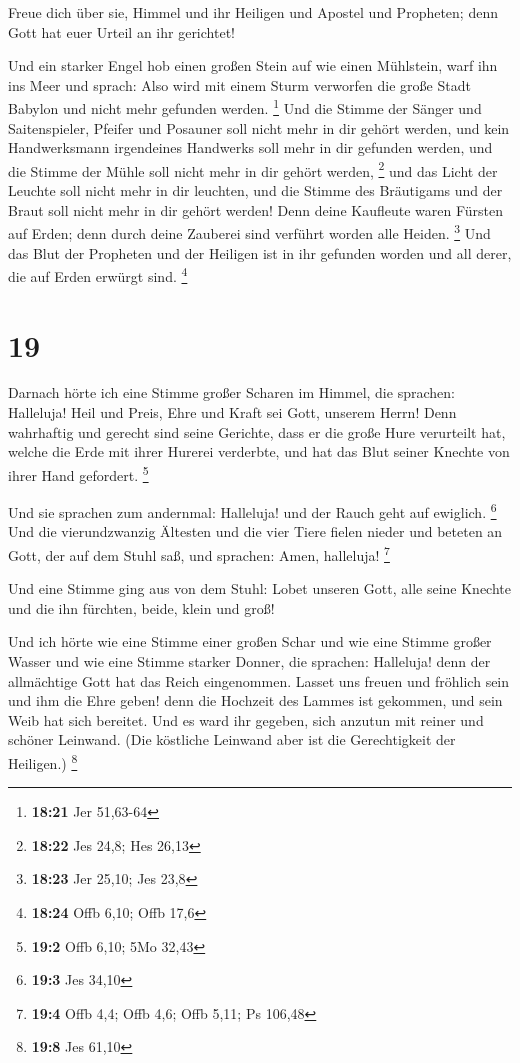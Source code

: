  Freue dich über sie, Himmel und ihr Heiligen und Apostel
und Propheten; denn Gott hat euer Urteil an ihr gerichtet!

 Und ein starker Engel hob einen großen Stein auf wie
einen Mühlstein, warf ihn ins Meer und sprach: Also wird mit einem Sturm
verworfen die große Stadt Babylon und nicht mehr gefunden werden.
\footnote{\textbf{18:21} Jer 51,63-64}  Und die Stimme
der Sänger und Saitenspieler, Pfeifer und Posauner soll nicht mehr in
dir gehört werden, und kein Handwerksmann irgendeines Handwerks soll
mehr in dir gefunden werden, und die Stimme der Mühle soll nicht mehr in
dir gehört werden, \footnote{\textbf{18:22} Jes 24,8; Hes 26,13}
 und das Licht der Leuchte soll nicht mehr in dir
leuchten, und die Stimme des Bräutigams und der Braut soll nicht mehr in
dir gehört werden! Denn deine Kaufleute waren Fürsten auf Erden; denn
durch deine Zauberei sind verführt worden alle Heiden. \footnote{\textbf{18:23}
  Jer 25,10; Jes 23,8}  Und das Blut der Propheten und
der Heiligen ist in ihr gefunden worden und all derer, die auf Erden
erwürgt sind. \footnote{\textbf{18:24} Offb 6,10; Offb 17,6}

\hypertarget{section-8}{%
\section{19}\label{section-8}}

 Darnach hörte ich eine Stimme großer Scharen im Himmel,
die sprachen: Halleluja! Heil und Preis, Ehre und Kraft sei Gott,
unserem Herrn!  Denn wahrhaftig und gerecht sind seine
Gerichte, dass er die große Hure verurteilt hat, welche die Erde mit
ihrer Hurerei verderbte, und hat das Blut seiner Knechte von ihrer Hand
gefordert. \footnote{\textbf{19:2} Offb 6,10; 5Mo 32,43}

 Und sie sprachen zum andernmal: Halleluja! und der Rauch
geht auf ewiglich. \footnote{\textbf{19:3} Jes 34,10}  Und
die vierundzwanzig Ältesten und die vier Tiere fielen nieder und beteten
an Gott, der auf dem Stuhl saß, und sprachen: Amen, halleluja!
\footnote{\textbf{19:4} Offb 4,4; Offb 4,6; Offb 5,11; Ps 106,48}

 Und eine Stimme ging aus von dem Stuhl: Lobet unseren
Gott, alle seine Knechte und die ihn fürchten, beide, klein und groß!

 Und ich hörte wie eine Stimme einer großen Schar und wie
eine Stimme großer Wasser und wie eine Stimme starker Donner, die
sprachen: Halleluja! denn der allmächtige Gott hat das Reich
eingenommen.  Lasset uns freuen und fröhlich sein und ihm
die Ehre geben! denn die Hochzeit des Lammes ist gekommen, und sein Weib
hat sich bereitet.  Und es ward ihr gegeben, sich anzutun
mit reiner und schöner Leinwand. (Die köstliche Leinwand aber ist die
Gerechtigkeit der Heiligen.) \footnote{\textbf{19:8} Jes 61,10}

